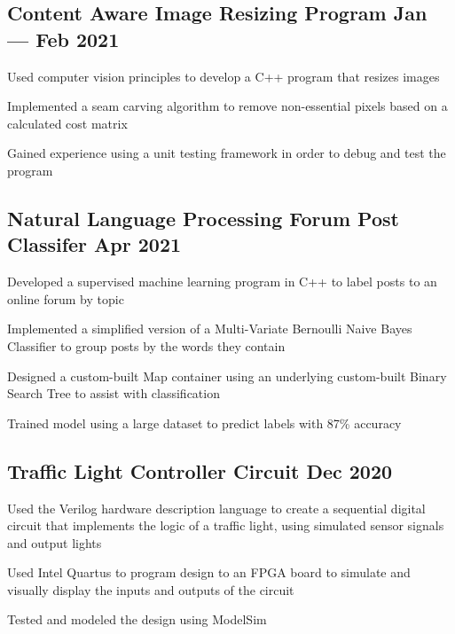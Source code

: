 \documentclass[letter,10pt]{article}
\begin{document}
\subsection{{Content Aware Image Resizing Program \hfill Jan --- Feb 2021}}
\begin{zitemize}
\item Used computer vision principles to develop a C++ program that resizes images
\item Implemented a seam carving algorithm to remove non-essential pixels based on a calculated cost matrix 
\item Gained experience using a unit testing framework in order to debug and test the program
\end{zitemize}

\subsection{{Natural Language Processing Forum Post Classifer \hfill Apr 2021}}
\begin{zitemize}
\item Developed a supervised machine learning program in C++ to label posts to an online forum by topic
\item Implemented a simplified version of a Multi-Variate Bernoulli Naive Bayes Classifier to group posts by the words they contain
\item Designed a custom-built Map container using an underlying custom-built Binary Search Tree to assist with classification
\item Trained model using a large dataset to predict labels with 87\% accuracy
\end{zitemize}

\subsection{{Traffic Light Controller Circuit \hfill Dec 2020}}
\begin{zitemize}
\item Used the Verilog hardware description language to create a sequential digital circuit that implements the logic of a traffic light, using simulated sensor signals and output lights
\item Used Intel Quartus to program design to an FPGA board to simulate and visually display the inputs and outputs of the circuit
\item Tested and modeled the design using ModelSim
\end{zitemize}
\end{document}
